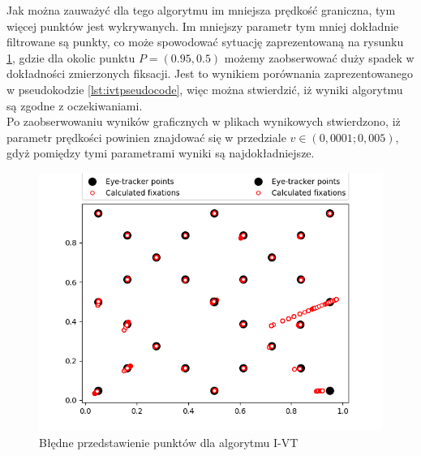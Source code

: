 Jak można zauważyć dla tego algorytmu im mniejsza prędkość graniczna, tym więcej punktów jest wykrywanych. Im mniejszy parametr tym mniej dokładnie filtrowane są punkty, co może spowodować sytuację zaprezentowaną na rysunku \ref{fig:ivterrorresults}, gdzie dla okolic punktu $P = (0.95,0.5)$ możemy zaobserwować duży spadek w dokładności zmierzonych fiksacji.
Jest to wynikiem porównania zaprezentowanego w pseudokodzie \ref{lst:ivtpseudocode}, więc można stwierdzić, iż wyniki algorytmu są zgodne z oczekiwaniami.\\
Po zaobserwowaniu wyników graficznych w plikach wynikowych stwierdzono, iż parametr prędkości powinien znajdować się w przedziale $v \in (0,0001;0,005)$, gdyż pomiędzy tymi parametrami wyniki są najdokładniejsze.
\begin{figure}[H]
    \centering
    \captionsetup{justification=centering,margin=2cm}
    \includegraphics[width=\linewidth]{resources/ivt-errorresults.png}
    \caption{Błędne przedstawienie punktów dla algorytmu I-VT}
    \label{fig:ivterrorresults}
\end{figure}

